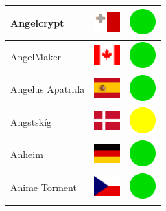 \documentclass[12pt, a4paper, twoside]{report}
\begin{document}
\begin{center}
\begin{longtable}{|p{5cm}|p{2cm}|p{2cm}|}
 Angelcrypt                                                 & \includegraphics[width=1cm]{../img/flags/mt} &   \includegraphics[width=1cm]{../likes/y} \\ \hline
 AngelMaker                                                 & \includegraphics[width=1cm]{../img/flags/ca} &   \includegraphics[width=1cm]{../likes/y} \\ \hline
 Angelus Apatrida                                           & \includegraphics[width=1cm]{../img/flags/es} &   \includegraphics[width=1cm]{../likes/y} \\ \hline
 Angstskíg                                                  & \includegraphics[width=1cm]{../img/flags/dk} &   \includegraphics[width=1cm]{../likes/m} \\ \hline
 Anheim                                                     & \includegraphics[width=1cm]{../img/flags/de} &   \includegraphics[width=1cm]{../likes/y} \\ \hline
 Anime Torment                                              & \includegraphics[width=1cm]{../img/flags/cz} &   \includegraphics[width=1cm]{../likes/y} \\ \hline

\end{longtable}
\end{center}
\end{document}
